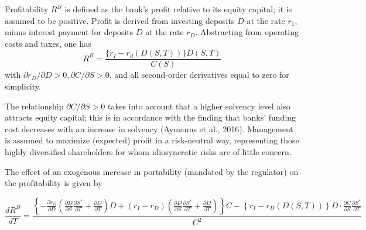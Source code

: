 Profitability $R^B$ is defined as the bank's profit relative to its equity capital; it is assumed to be positive. Profit is derived from investing deposits $D$ at the rate $r_1$, minus interest payment for deposits $D$ at the rate $r_D$. Abstracting from operating costs and taxes, one has 
\begin{equation}
    R^B=\frac{\{r_I-r_d(D(S,T))\}D(S,T)}{C(S)} \label{eq:RB}
\end{equation}
with $\partial r_D / \partial D >0, \partial C / \partial S >0$, and all second-order derivatives equal to zero for simplicity. 




The relationship $\partial C / \partial S >0$ takes into account that a higher solvency level also attracts equity capital; this is in accordance with the finding that banks' funding cost decreases with an increase in solvency (Aymanns et al., 2016). Management is assumed to maximize (expected) profit in a risk-neutral way, representing those highly diversified shareholders for whom idiosyncratic risks are of little concern.


The effect of an exogenous increase in portability (mandated by the regulator) on the profitability is given by

\footnotesize
\begin{equation}
    \frac{dR^B}{dT} = 
    \frac{
        \left\{ 
        -\frac{\partial r_D}{\partial D} 
        \left( \frac{\partial D}{\partial S} \frac{\partial S^*}{\partial T} + \frac{\partial D}{\partial T} \right) D
        + (r_I - r_D) 
        \left( \frac{\partial D}{\partial S} \frac{\partial S^*}{\partial T} + \frac{\partial D}{\partial T} \right) 
        \right\} C 
        - \left\{ r_I - r_D \left( D(S,T) \right) \right\} D \cdot \frac{\partial C}{\partial S} \frac{\partial S^*}{\partial T} \label{eq:dRB}
    }{C^2} 
\end{equation}
\normalsize

